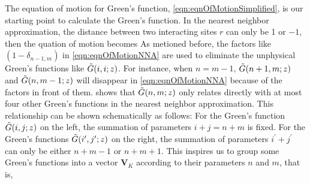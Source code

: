 The equation of motion for Green's function, \autoref{eqn:eqnOfMotionSimplified}, is our starting point to calculate
the Green's function. In the nearest neighbor approximation, the distance between two interacting sites $r$ can only 
be 1 or $-1$, then the quation of motion becomes
As metioned before, the factors like $(1- \delta_{n-1, m})$ in \autoref{eqn:eqnOfMotionNNA} are used to eliminate 
the unphysical Green's functions like $\Tilde{G}(i, i; z)$. For instance, when $n = m - 1$, $\Tilde{G}(n+1, m; z)$ and 
$\Tilde{G}(n, m-1; z)$ will disappear in \autoref{eqn:eqnOfMotionNNA} because of the factors in front of them. 
 shows that $\Tilde{G}(n, m; z)$ only relates directly with at most four other Green's
functions in the nearest neighbor approximation. This relationship can be shown schematically as follows:
For the Green's function $\Tilde{G}(i, j; z)$ on the left, the summation of parameters $i + j = n + m$ is fixed. For the 
Green's functions $\Tilde{G}(i^{\prime}, j^{\prime}; z)$ on the right, the summation of parameters
 $i^{\prime} + j^{\prime}$ can only be either $n+m-1$ or $n+m+1$. 
This inspires us to group some Green's functions into a vector $\mathbf{V}_{K}$ according to their parameters $n$ and $m$, that is,
